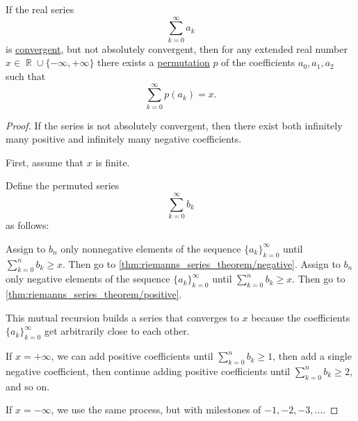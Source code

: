 \begin{theorem}\label{thm:riemanns_series_permutation_theorem}
  If the real series
  \begin{equation*}
    \sum_{k=0}^\infty a_k
  \end{equation*}
  is \hyperref[def:convergent_series]{convergent}, but not absolutely convergent, then for any extended real number \( x \in \BbbR \cup \{ -\infty, +\infty \} \) there exists a \hyperref[def:symmetric_group]{permutation} \( p \) of the coefficients \( a_0, a_1, a_2 \)
  such that
  \begin{equation*}
    \sum_{k=0}^\infty p(a_k) = x.
  \end{equation*}
\end{theorem}
\begin{proof}
  If the series is not absolutely convergent, then there exist both infinitely many positive and infinitely many negative coefficients.

  First, assume that \( x \) is finite.

  Define the permuted series
  \begin{equation*}
    \sum_{k=0}^\infty b_k
  \end{equation*}
  as follows:
  \begin{thmenum}
     Assign to \( b_n \) only nonnegative elements of the sequence \( \{ a_k \}_{k=0}^\infty \) until \( \sum_{k=0}^n b_k \geq x \). Then go to \ref{thm:riemanns_series_theorem/negative}.
     Assign to \( b_n \) only negative elements of the sequence \( \{ a_k \}_{k=0}^\infty \) until \( \sum_{k=0}^n b_k \geq x \). Then go to \ref{thm:riemanns_series_theorem/positive}.
  \end{thmenum}

  This mutual recursion builds a series that converges to \( x \) because the coefficients \( \{ a_k \}_{k=0}^\infty \) get arbitrarily close to each other.

  If \( x = +\infty \), we can add positive coefficients until \( \sum_{k=0}^n b_k \geq 1 \), then add a single negative coefficient, then continue adding positive coefficients until \( \sum_{k=0}^n b_k \geq 2 \), and so on.

  If \( x = -\infty \), we use the same process, but with milestones of \( -1, -2, -3, \ldots \).
\end{proof}

